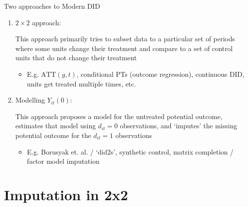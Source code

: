 \documentclass[t]{beamer}
\begin{document}

\begin{frame}{Two approaches to Modern DID}
  \begin{enumerate}
    \item $2 \times 2$ approach:
    
    \smallskip 
    This approach primarily tries to subset data to a particular set of periods where some units change their treatment and compare to a set of control units that do not change their treatment

    \medskip
    \begin{itemize}
      \item E.g. $\text{ATT}(g, t)$, conditional PTs (outcome regression), continuous DID, units get treated multiple times, etc. 
    \end{itemize}
    

    \pause
    \bigskip
    \item Modelling $Y_{it}(0)$:
    
    \smallskip 
    This approach proposes a model for the untreated potential outcome, estimates that model using $d_{it} = 0$ observations, and `imputes' the missing potential outcome for the $d_{it} = 1$ observations

    \medskip
    \begin{itemize}
      \item E.g. Borusyak et. al. / `did2s', synthetic control, matrix completion / factor model imputation
    \end{itemize}

    
  \end{enumerate}
\end{frame}

\section{Imputation in 2x2}
\end{document}
